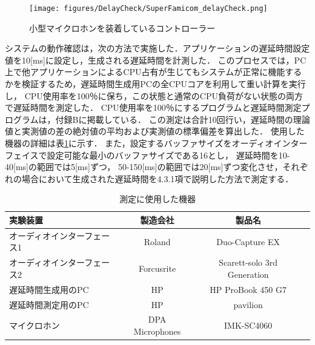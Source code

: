 \begin{figure}[bt]
  \centering
  \texttt{[image: figures/DelayCheck/SuperFamicom\_delayCheck.png]}
  \caption{小型マイクロホンを装着しているコントローラー}
  \label{fig:super_famicom}
\end{figure}
システムの動作確認は，次の方法で実施した．アプリケーションの遅延時間設定値を10[ms]に設定し，生成される遅延時間を計測した．
このプロセスでは，PC上で他アプリケーションによるCPU占有が生じてもシステムが正常に機能するかを検証するため，遅延時間生成用PCの全CPUコアを利用して重い計算を実行し，
CPU使用率を100％に保ち，この状態と通常のCPU負荷がない状態の両方で遅延時間を測定した．
CPU使用率を100％にするプログラムと遅延時間測定プログラムは，付録Bに掲載している．
この測定は合計10回行い，遅延時間の理論値と実測値の差の絶対値の平均および実測値の標準偏差を算出した．
使用した機器の詳細は表\ref{table:device_delay_check}に示す．
また，設定するバッファサイズをオーディオインターフェイスで設定可能な最小のバッファサイズである16とし，
遅延時間を10-40[ms]の範囲では5[ms]ずつ，
50-150[ms]の範囲では20[ms]ずつ変化させ，それぞれの場合において生成された遅延時間を4.3.1項で説明した方法で測定する．
\begin{table}[tbp]
  \caption{測定に使用した機器}
  \label{table:device_delay_check}
  \centering
  \begin{tabular}{lccc}
    \hline
    実験装置 & 製造会社 & 製品名\\
    \hline \hline
    オーディオインターフェース1  & Roland & Duo-Capture EX\\
    オーディオインターフェース2  & Forcusrite & Scarett-solo 3rd Generation\\
    遅延時間生成用のPC  & HP & HP ProBook 450 G7\\
    遅延時間測定用のPC  & HP & pavilion\\
    マイクロホン  & DPA Microphones & IMK-SC4060
\\
    \hline
  \end{tabular}
\end{table}

